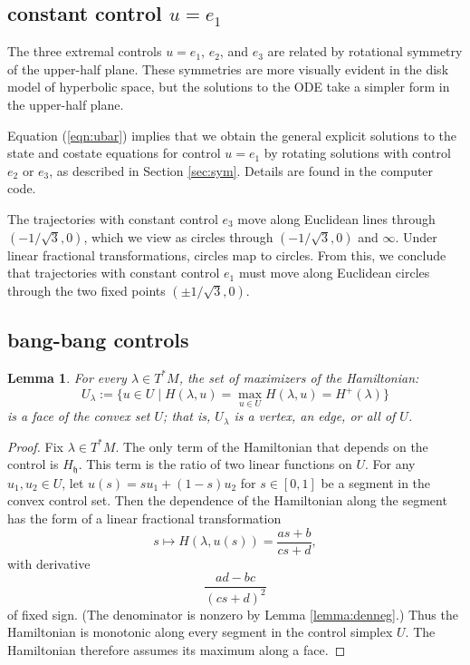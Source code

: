 \documentclass{article}
\newtheorem{lemma}[theorem]{Lemma}
\theoremstyle{remark}
\def\h{\mathfrak h}
\begin{document}
\subsection{constant control $u=e_1$}
\label{sec:e1}

The three extremal controls $u=e_1$, $e_2$, and $e_3$ are related by
rotational symmetry of the upper-half plane.  These symmetries are
more visually evident in the disk model of hyperbolic space, but the
solutions to the ODE take a simpler form in the upper-half plane.


Equation (\ref{eqn:ubar}) implies that we obtain the general
explicit solutions to the state and costate equations for control
$u=e_1$ by rotating solutions with control $e_2$ or $e_3$, as
described in Section \ref{sec:sym}.  
Details are found in the
computer code.

The trajectories with constant control $e_3$ move along Euclidean
lines through $(-1/\sqrt{3},0)$, which we view as circles through
$(-1/\sqrt{3},0)$ and $\infty$.  Under linear fractional
transformations, circles map to circles.  From this, we conclude that
trajectories with constant control $e_1$ must move along Euclidean
circles through the two fixed points $(\pm 1/\sqrt{3},0)$.


\subsection{bang-bang controls}\label{sec:bang}


\begin{lemma}\label{lemma:u-lambda} 
For every $\lambda\in T^*M$, the set of maximizers of
  the Hamiltonian:
\[
U_\lambda := \{u \in U \mid H(\lambda,u) = 
\max_{u\in U} H(\lambda,u) = H^+(\lambda)\}
\]
is a face of the convex set $U$; that is, $U_\lambda$ is a vertex, an
edge, or all of $U$.
\end{lemma}

\begin{proof}
  Fix $\lambda\in T^*M$.  The only term of the Hamiltonian that
  depends on the control is $H_{\h}$.  This term is the ratio of two
  linear functions on $U$.  For any $u_1,u_2\in U$, let $u(s) = s u_1
  + (1-s) u_2$ for $s\in [0,1]$ be a segment in the convex control
  set.  Then the dependence of the Hamiltonian along the segment has
  the form of a linear fractional transformation
\[
s\mapsto H(\lambda,u(s))=\frac{a s + b}{c s + d},
\]
with derivative
\[
\frac{ad - bc}{(c s + d)^2}
\]
of fixed sign.  (The denominator is nonzero by Lemma
\ref{lemma:denneg}.)  Thus the Hamiltonian is monotonic along every
segment in the control simplex $U$.  The Hamiltonian therefore assumes
its maximum along a face.
\end{proof}
\end{document}
